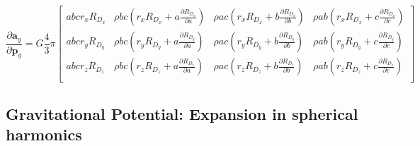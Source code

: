 \begin{equation}
    \frac{\partial{\bm{a}}_g}{\partial{\mathbf{p}_g}} =
    G\frac{4}{3}\pi
    \begin{bmatrix}
    {abc}{r_x}{R_{D_x}} & \rho bc({r_x}{R_{D_x}} + a\frac{\partial{R_{D_x}}}{\partial{a}}) & \rho ac({r_x}{R_{D_x}} + b\frac{\partial{R_{D_x}}}{\partial{b}}) & \rho ab({r_x}{R_{D_x}} + c\frac{\partial{R_{D_x}}}{\partial{c}})\\
    {abc}{r_y}{R_{D_y}} & \rho bc({r_y}{R_{D_y}} + a\frac{\partial{R_{D_y}}}{\partial{a}}) & \rho ac({r_y}{R_{D_y}} + b\frac{\partial{R_{D_y}}}{\partial{b}}) & \rho ab({r_y}{R_{D_y}} + c\frac{\partial{R_{D_y}}}{\partial{c}})\\
    {abc}{r_z}{R_{D_z}} & \rho bc({r_z}{R_{D_z}} + a\frac{\partial{R_{D_z}}}{\partial{a}}) & \rho ac({r_z}{R_{D_z}} + b\frac{\partial{R_{D_z}}}{\partial{b}}) & \rho ab({r_z}{R_{D_z}} + c\frac{\partial{R_{D_z}}}{\partial{c}})\\
    \end{bmatrix}
\end{equation}

\subsection{Gravitational Potential: Expansion in spherical harmonics}
